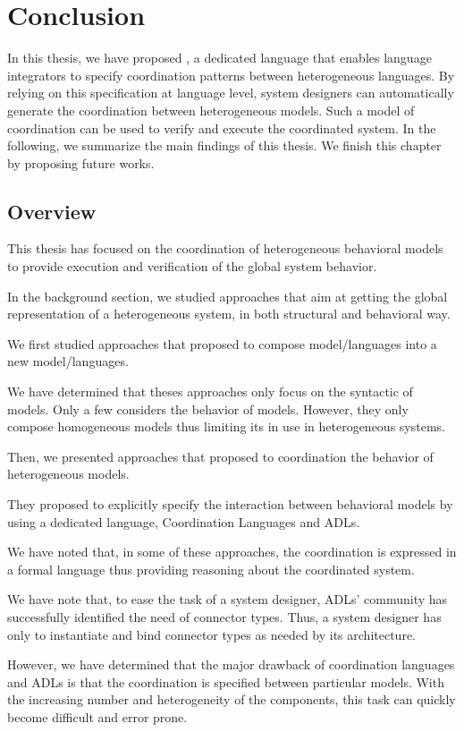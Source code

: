 \chapter{Conclusion}
\label{ch:conclusions}
In this thesis, we have proposed \bcool, a dedicated language that enables language integrators to specify coordination patterns between heterogeneous languages. By relying on this specification at language level, system designers can automatically generate the coordination between heterogeneous models. Such a model of coordination can be used to verify and execute the coordinated system. In the following, we summarize the main findings of this thesis. We finish this chapter by proposing future works. 

\section{Overview}
	
	
This thesis has focused on the coordination of heterogeneous behavioral models to provide execution and verification of the global system behavior. 

In the background section, we studied approaches that aim at getting the global representation of a heterogeneous system, in both structural and behavioral way. 

We first studied approaches that proposed to compose model/languages into a new model/languages. 

We have determined that theses approaches only focus on the syntactic of models. Only a few considers the behavior of models. However, they only compose homogeneous models thus limiting its in use in heterogeneous systems.     

Then, we presented approaches that proposed to coordination the behavior of heterogeneous models. 

They proposed to explicitly specify the interaction between behavioral models by using a dedicated language, \ie Coordination Languages and ADLs. 

We have noted that, in some of these approaches, the coordination is expressed in a formal language thus providing reasoning about the coordinated system. 


We have note that, to ease the task of a system designer, ADLs' community has successfully identified the need of connector types. Thus, a system designer has only to instantiate and bind connector types as needed by its architecture.

However, we have determined that the major drawback of coordination languages and ADLs is that the coordination is specified between particular models. With the increasing number and heterogeneity of the components, this task can quickly become difficult and error prone.

